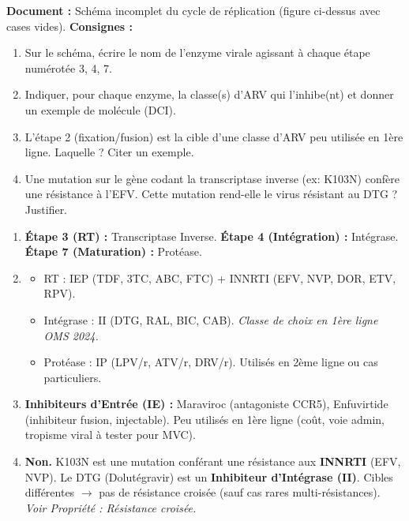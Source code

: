 \documentclass[11pt]{article}
\begin{document}
\begin{exercice}
\textbf{Document :} Schéma incomplet du cycle de réplication (figure ci-dessus avec cases vides).
\textbf{Consignes :}
\begin{enumerate}
\item Sur le schéma, écrire le nom de l'enzyme virale agissant à chaque étape numérotée 3, 4, 7.
\item Indiquer, pour chaque enzyme, la classe(s) d'ARV qui l'inhibe(nt) et donner un exemple de molécule (DCI).
\item L'étape 2 (fixation/fusion) est la cible d'une classe d'ARV peu utilisée en 1ère ligne. Laquelle ? Citer un exemple.
\item Une mutation sur le gène codant la transcriptase inverse (ex: K103N) confère une résistance à l'EFV. Cette mutation rend-elle le virus résistant au DTG ? Justifier.
\end{enumerate}
\end{exercice}

\begin{corrige}
\begin{enumerate}
\item \textbf{Étape 3 (RT) :} Transcriptase Inverse. \textbf{Étape 4 (Intégration) :} Intégrase. \textbf{Étape 7 (Maturation) :} Protéase.
\item \begin{itemize}
    \item RT : IEP (TDF, 3TC, ABC, FTC) + INNRTI (EFV, NVP, DOR, ETV, RPV).
    \item Intégrase : II (DTG, RAL, BIC, CAB). \textit{Classe de choix en 1ère ligne OMS 2024.}
    \item Protéase : IP (LPV/r, ATV/r, DRV/r). Utilisés en 2ème ligne ou cas particuliers.
  \end{itemize}
\item \textbf{Inhibiteurs d'Entrée (IE) :} Maraviroc (antagoniste CCR5), Enfuvirtide (inhibiteur fusion, injectable). Peu utilisés en 1ère ligne (coût, voie admin, tropisme viral à tester pour MVC).
\item \textbf{Non.} K103N est une mutation conférant une résistance aux \textbf{INNRTI} (EFV, NVP). Le DTG (Dolutégravir) est un \textbf{Inhibiteur d'Intégrase (II)}. Cibles différentes $\to$ pas de résistance croisée (sauf cas rares multi-résistances). \textit{Voir Propriété : Résistance croisée.}
\end{enumerate}
\end{corrige}
\end{document}
